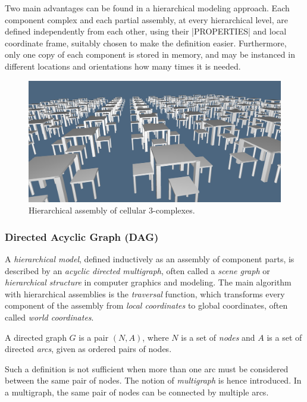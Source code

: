 \begin{coding}
Two main advantages can be found in a hierarchical modeling approach. Each component complex  and each partial assembly, at every hierarchical level, are defined independently from each other, using their |PROPERTIES| and local coordinate frame, suitably chosen to make the  definition easier.
Furthermore, only one copy of each component is stored in memory, and may be instanced
in different locations and orientations how many times it is needed.

\begin{figure}[htbp] %
   \includegraphics[width=\linewidth]{chapter-04/figs/refectory.png}
   \hspace{5mm}
   \caption{Hierarchical assembly of cellular 3-complexes.}
   \label{fig:refectory}
\end{figure}  


\subsubsection*{Directed Acyclic Graph (DAG)}\label{sect:4-3-2-1}

A \emph{hierarchical model}, defined inductively as an assembly of component parts,
is described by an \emph{acyclic directed multigraph}, often called a \emph{scene graph} or \emph{hierarchical structure} in computer graphics and modeling.  The main algorithm with hierarchical assemblies is the \emph{traversal} function, which transforms every component of the assembly from \emph{local coordinates} to global coordinates, often called \emph{world coordinates}.

\begin{definition} A directed graph $G$ is a pair $(N,A)$, where
$N$ is a set of \emph{nodes} and $A$ is a set of directed \emph{arcs}, given as ordered pairs of nodes.  
\end{definition}
Such a definition is not sufficient when more than one arc must be considered
between the same pair of nodes.
The notion of \emph{multigraph} is hence introduced.  
In a multigraph, the same pair of nodes can be connected by multiple arcs.


\end{coding}
